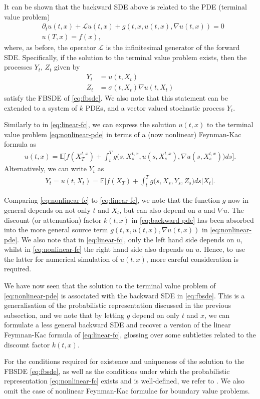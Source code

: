 It can be shown that the backward SDE above is related to the PDE (terminal value problem)
%
\begin{align}
    \label{eq:nonlinear-pde}
    &\partial_t u(t,x) + \mathcal{L}u(t,x) + g(t,x,u(t,x),\nabla u(t,x)) = 0 \\
    &u(T,x) = f(x), 
\end{align} 
%
where, as before, the operator $\mathcal{L}$ is the infinitesimal generator of the forward SDE. Specifically, if the solution to the terminal value problem exists, then the processes $Y_t$, $Z_t$ given by
%
\begin{align} 
    Y_t &= u(t,X_t)\\
    Z_t &= \sigma(t,X_t) \nabla u(t,X_t)
\end{align}
%
satisfy the FBSDE of \autoref{eq:fbsde}. We also note that this statement can be extended to a system of $k$ PDEs, and a vector valued stochastic process $Y_t$. 

Similarly to in \autoref{eq:linear-fc}, we can express the solution $u(t,x)$ to the terminal value problem \autoref{eq:nonlinear-pde} in terms of a (now nonlinear) Feynman-Kac formula as
%
\begin{align} 
    \label{eq:nonlinear-fc}
    u(t,x) = \mathbb{E}\bigg[ f(X_T^{t,x}) + \int_t^T g\big(s,X_s^{t,x},u(s,X_s^{t,x}),\nabla u(s,X_s^{t,x})\big)ds \bigg].
\end{align} 
%
Alternatively, we can write $Y_t$ as
%
\begin{align} 
    \label{eq:nonlinear-fc-for-y}
    Y_t = u(t,X_t) = \mathbb{E}\bigg[ f(X_T) + \int_t^T g\big(s,X_s,Y_s,Z_s\big)ds \Big\lvert X_t \bigg].
\end{align}
%

Comparing \autoref{eq:nonlinear-fc} to \autoref{eq:linear-fc}, we note that the function $g$ now in general depends on not only $t$ and $X_t$, but can also depend on $u$ and $\nabla u$. The discount (or attenuation) factor $k(t,x)$ in \autoref{eq:backward-pde} has been absorbed into the more general source term $g(t,x,u(t,x),\nabla u(t,x))$ in \autoref{eq:nonlinear-pde}. We also note that in \autoref{eq:linear-fc}, only the left hand side depends on $u$, whilst in \autoref{eq:nonlinear-fc} the right hand side also depends on $u$. Hence, to use the latter for numerical simulation of $u(t,x)$, more careful consideration is required.

We have now seen that the solution to the terminal value problem of \autoref{eq:nonlinear-pde} is associated with the backward SDE in \autoref{eq:fbsde}. This is a generalisation of the probabilistic representation discussed in the previous subsection, and we note that by letting $g$ depend on only $t$ and $x$, we can formulate a less general backward SDE and recover a version of the linear Feymnan-Kac formula of \autoref{eq:linear-fc}, glossing over some subtleties related to the discount factor $k(t,x)$.

For the conditions required for existence and uniqueness of the solution to the FBSDE \autoref{eq:fbsde}, as well as the conditions under which the probabilistic representation \autoref{eq:nonlinear-fc} exists and is well-defined, we refer to \cite{gobet2016monte}. We also omit the case of nonlinear Feynman-Kac formulae for boundary value problems.

